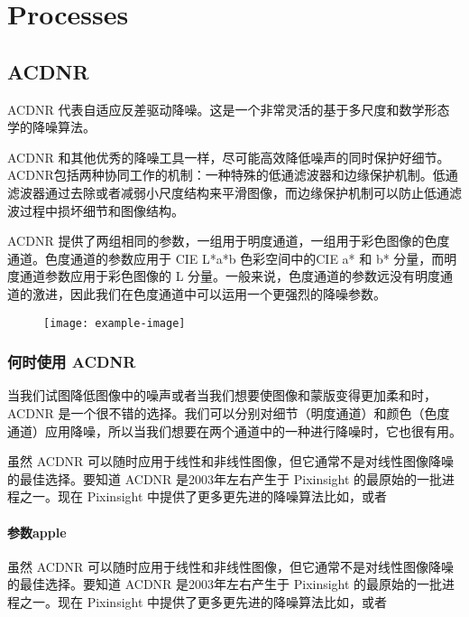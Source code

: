 \chapter{Processes}

\section{ACDNR}

ACDNR 代表自适应反差驱动降噪。这是一个非常灵活的基于多尺度和数学形态学的降噪算法。

ACDNR 和其他优秀的降噪工具一样，尽可能高效降低噪声的同时保护好细节。ACDNR包括两种协同工作的机制：一种特殊的低通滤波器和边缘保护机制。低通滤波器通过去除或者减弱小尺度结构来平滑图像，而边缘保护机制可以防止低通滤波过程中损坏细节和图像结构。

ACDNR 提供了两组相同的参数，一组用于明度通道，一组用于彩色图像的色度通道。色度通道的参数应用于 CIE L*a*b 色彩空间中的CIE a* 和 b* 分量，而明度通道参数应用于彩色图像的 L 分量。一般来说，色度通道的参数远没有明度通道的激进，因此我们在色度通道中可以运用一个更强烈的降噪参数。

\begin{figure}[h]
  \centering
  \texttt{[image: example-image]}
\end{figure}


\subsection{何时使用 ACDNR}

当我们试图降低图像中的噪声或者当我们想要使图像和蒙版变得更加柔和时，ACDNR 是一个很不错的选择。我们可以分别对细节（明度通道）和颜色（色度通道）应用降噪，所以当我们想要在两个通道中的一种进行降噪时，它也很有用。

虽然 ACDNR 可以随时应用于线性和非线性图像，但它通常不是对线性图像降噪的最佳选择。要知道 ACDNR 是2003年左右产生于 Pixinsight 的最原始的一批进程之一。现在 Pixinsight 中提供了更多更先进的降噪算法比如，或者 


\subsubsection{参数apple}

虽然 ACDNR 可以随时应用于线性和非线性图像，但它通常不是对线性图像降噪的最佳选择。要知道 ACDNR 是2003年左右产生于 Pixinsight 的最原始的一批进程之一。现在 Pixinsight 中提供了更多更先进的降噪算法比如，或者 

